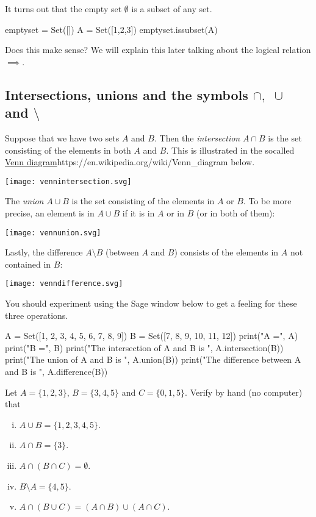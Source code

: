 \documentclass{article}
\begin{document}
It turns out that the empty set $\emptyset$ is a subset of any set.

\begin{sage}
emptyset = Set([])
A = Set([1,2,3])
emptyset.issubset(A)
\end{sage}

Does this
make sense? We will explain this later talking about the logical relation $\implies$.

\subsection{Intersections, unions and the symbols $\cap,\,\, \cup$ and $\setminus$}

Suppose that we have two sets $A$ and $B$. Then the \emph{intersection} $A\cap B$ is the
set consisting of the elements in both $A$ and $B$. This is illustrated in the
socalled \url{Venn diagram}{https://en.wikipedia.org/wiki/Venn_diagram} below.

\texttt{[image: vennintersection.svg]}

The \emph{union} $A\cup B$ is the
set consisting of the elements in $A$ or $B$. To be more precise, an element is in
$A\cup B$ if it is in $A$ or in $B$ (or in both of them):

\texttt{[image: vennunion.svg]}

Lastly, the
difference $A\setminus B$ (between $A$ and $B$) consists of the elements
in $A$ not contained in $B$:

\texttt{[image: venndifference.svg]}

You should experiment using the Sage window below to get a feeling for these three operations.

\begin{sage}
A = Set([1, 2, 3, 4, 5, 6, 7, 8, 9])
B = Set([7, 8, 9, 10, 11, 12])
print("A =", A)
print("B =", B)
print("The intersection of A and B is ", A.intersection(B))
print("The union of A and B is ", A.union(B))
print("The difference between A and B is ", A.difference(B))
\end{sage}

\beginshex
Let $A = \{1, 2, 3\}$, $B = \{3, 4, 5\}$ and $C = \{0, 1, 5\}$. Verify by hand (no computer) that
\begin{enumerate}[(i)]
\item
  $A\cup B = \{1, 2, 3, 4, 5\}$.
\item
  $A\cap B = \{3\}$.
\item
  $A\cap (B\cap C) = \emptyset$.
\item
  $B\setminus A = \{4, 5\}$.
\item
  $
A \cap (B\cup C) = (A\cap B) \cup (A \cap C).
  $
\end{enumerate}
\endshex
\end{document}
